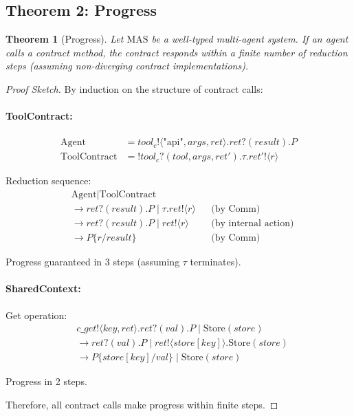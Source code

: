 \documentclass{article}
\newtheorem{theorem}{Theorem}
\begin{document}
\subsection{Theorem 2: Progress}

\begin{theorem}[Progress]
Let $\text{MAS}$ be a well-typed multi-agent system. If an agent calls a contract method, the contract responds within a finite number of reduction steps (assuming non-diverging contract implementations).
\end{theorem}

\begin{proof}[Proof Sketch]
By induction on the structure of contract calls:

\paragraph{ToolContract:}
\begin{align*}
\text{Agent} &= tool_c!\langle \text{"api"}, args, ret \rangle.ret?(result).P \\
\text{ToolContract} &= !tool_c?(tool, args, ret').\tau.ret'!\langle r \rangle
\end{align*}

Reduction sequence:
\begin{align*}
&\text{Agent} \mid \text{ToolContract} \\
&\to ret?(result).P \mid \tau.ret!\langle r \rangle && \text{(by Comm)} \\
&\to ret?(result).P \mid ret!\langle r \rangle && \text{(by internal action)} \\
&\to P\{r/result\} && \text{(by Comm)}
\end{align*}

Progress guaranteed in 3 steps (assuming $\tau$ terminates).

\paragraph{SharedContext:}
Get operation:
\begin{align*}
&c\_get!\langle key, ret \rangle.ret?(val).P \mid \text{Store}(store) \\
&\to ret?(val).P \mid ret!\langle store[key] \rangle.\text{Store}(store) \\
&\to P\{store[key]/val\} \mid \text{Store}(store)
\end{align*}

Progress in 2 steps.

Therefore, all contract calls make progress within finite steps.
\end{proof}
\end{document}
